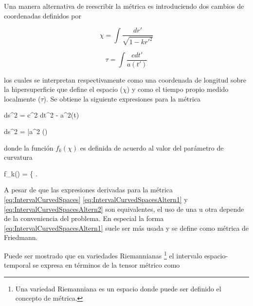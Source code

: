 Una manera alternativa de reescribir la métrica es introduciendo dos cambios 
de coordenadas definidos por 


\[ \chi = \int \frac{ dr'}{\sqrt{1 - k r'^2}}\]


\[ \tau = \int \frac{ c dt'}{a(t')}\]


los cuales se interpretan respectivamente como una coordenada de longitud 
sobre la hipersuperficie que define el espacio ($\chi$) y como el tiempo 
propio medido localmente ($\tau$). Se obtiene la siguiente expresiones para 
la métrica


{ ds^2 = c^2 dt^2 - a^2(t)  }


{ ds^2 = \bar a^2 (\tau) }


donde la función $f_k(\chi)$ es definida de acuerdo al valor del parámetro 
de curvatura


{ f_k(\chi) = \left\{   \right.  }


A pesar de que las expresiones derivadas para la métrica 
\ref{eq:IntervalCurvedSpaces} \ref{eq:IntervalCurvedSpacesAltern1} y
\ref{eq:IntervalCurvedSpacesAltern2} son equivalentes, el uso de una u otra
depende de la conveniencia del problema. En especial la forma 
\ref{eq:IntervalCurvedSpacesAltern1} suele ser más usada y se define como 
métrica de Friedmann.


Puede ser mostrado que en variedades Riemannianas 
\footnote{Una variedad Riemanniana es un espacio donde puede ser definido el 
concepto de métrica.} 
el intervalo espacio-temporal se expresa en términos de la tensor métrico
como \cite{weinberg1972}


